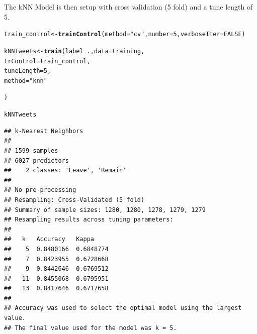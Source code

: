 \documentclass[10pt  ,usenames, dvipsnames]{article}\usepackage[]{graphicx}\usepackage[]{color}
\makeatletter
\newcommand{\hlnum}[1]{\textcolor[rgb]{0.686,0.059,0.569}{#1}}%
\newcommand{\hlstr}[1]{\textcolor[rgb]{0.192,0.494,0.8}{#1}}%
\newcommand{\hlopt}[1]{\textcolor[rgb]{0,0,0}{#1}}%
\newcommand{\hlstd}[1]{\textcolor[rgb]{0.345,0.345,0.345}{#1}}%
\newcommand{\hlkwb}[1]{\textcolor[rgb]{0.69,0.353,0.396}{#1}}%
\newcommand{\hlkwc}[1]{\textcolor[rgb]{0.333,0.667,0.333}{#1}}%
\newcommand{\hlkwd}[1]{\textcolor[rgb]{0.737,0.353,0.396}{\textbf{#1}}}%
\newenvironment{kframe}{%
 \def\at@end@of@kframe{}%
 \ifinner\ifhmode%
  \def\at@end@of@kframe{\end{minipage}}%
  \begin{minipage}{\columnwidth}%
 \fi\fi%
 \def\FrameCommand##1{\hskip\@totalleftmargin \hskip-\fboxsep
 \colorbox{shadecolor}{##1}\hskip-\fboxsep
     \hskip-\linewidth \hskip-\@totalleftmargin \hskip\columnwidth}%
 \MakeFramed {\advance\hsize-\width
   \@totalleftmargin\z@ \linewidth\hsize
   \@setminipage}}%
 {\par\unskip\endMakeFramed%
 \at@end@of@kframe}
\newenvironment{knitrout}{}{} %
\makeatother
\begin{document}
The kNN Model is then setup with cross validation (5 fold) and a tune length of 5. 

\begin{knitrout}
\color{fgcolor}\begin{kframe}
\begin{alltt}
\hlstd{train_control}\hlkwb{<-} \hlkwd{trainControl}\hlstd{(}\hlkwc{method}\hlstd{=}\hlstr{"cv"}\hlstd{,} \hlkwc{number}\hlstd{=}\hlnum{5}\hlstd{,}\hlkwc{verboseIter}\hlstd{=}\hlnum{FALSE}\hlstd{)}

\hlstd{kNNTweets} \hlkwb{<-} \hlkwd{train}\hlstd{(label}\hlopt{~}\hlstd{.,} \hlkwc{data} \hlstd{= training,}
                  \hlkwc{trControl} \hlstd{= train_control,}
                  \hlkwc{tuneLength} \hlstd{=}\hlnum{5}\hlstd{,}
                  \hlkwc{method} \hlstd{=} \hlstr{"knn"}

\hlstd{)}
\end{alltt}
\end{kframe}
\end{knitrout}





\begin{knitrout}
\color{fgcolor}\begin{kframe}
\begin{alltt}
\hlstd{kNNTweets}
\end{alltt}
\end{kframe}
\end{knitrout}

\begin{knitrout}
\color{fgcolor}\begin{kframe}
\begin{verbatim}
## k-Nearest Neighbors 
## 
## 1599 samples
## 6027 predictors
##    2 classes: 'Leave', 'Remain' 
## 
## No pre-processing
## Resampling: Cross-Validated (5 fold) 
## Summary of sample sizes: 1280, 1280, 1278, 1279, 1279 
## Resampling results across tuning parameters:
## 
##   k   Accuracy   Kappa    
##    5  0.8480166  0.6848774
##    7  0.8423955  0.6728668
##    9  0.8442646  0.6769512
##   11  0.8455068  0.6795951
##   13  0.8417646  0.6717658
## 
## Accuracy was used to select the optimal model using the largest value.
## The final value used for the model was k = 5.
\end{verbatim}
\end{kframe}
\end{knitrout}
\end{document}
